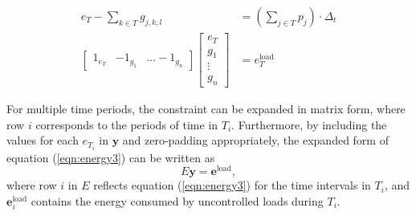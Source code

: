 \begin{equation}\label{eqn:energy3}
	\begin{aligned}
	e_T -\sum_{k\in T}g_{j,k,l} &= \left ( \sum_{j\in T}p_j \right ) \cdot \Delta_t \\
		\begin{bmatrix} 1_{e_T} & -1_{g_1} & \hdots -1_{g_n} \end{bmatrix} \begin{bmatrix}e_T \\ g_1 \\ \vdots \\ g_n \end{bmatrix} &= e^\text{load}_T
	\end{aligned}
\end{equation}
\par For multiple time periods, the constraint can be expanded in matrix form, where row $i$ corresponds to the periods of time in $T_i$. Furthermore, by including the values for each $e_{T_i}$ in $\mathbf{y}$ and zero-padding appropriately, the expanded form of equation (\ref{eqn:energy3}) can be written as  
\begin{equation}
	E\mathbf{y} = \mathbf{e}^\text{load},
\end{equation}
where row $i$ in $E$ reflects equation (\ref{eqn:energy3}) for the time intervals in $T_i$, and $\mathbf{e}^\text{load}_i$ contains the energy consumed by uncontrolled loads during $T_i$.

